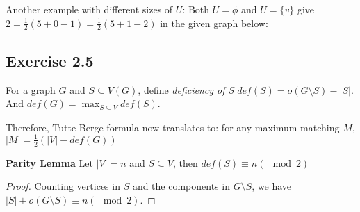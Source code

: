 \documentclass[12pt]{article}
\begin{document}
Another example with different sizes of $U$: Both $U=\phi$ and $U = \{v\}$ give $2 = \frac{1}{2}(5 + 0 - 1) = \frac{1}{2}(5 + 1 - 2)$ in the given graph below:

\begin{center}
\end{center}


\subsection*{Exercise 2.5}

For a graph $G$ and $S \subseteq V(G)$, define \textsl{deficiency of S} $def(S) = o(G \setminus S) - |S|$. And $def(G) = \max_{S \subseteq V} def(S)$.

Therefore, Tutte-Berge formula now translates to: for any maximum matching $M$, $|M| = \frac{1}{2}(|V| - def(G))$
\newline

\textbf{Parity Lemma} Let $|V| = n$ and $S \subseteq V$, then $def(S) \equiv n (\mod 2)$
\begin{proof}
Counting vertices in $S$ and the components in $G \setminus S$, we have $|S| + o(G \setminus S) \equiv n (\mod 2)$.
\end{proof}
\end{document}
